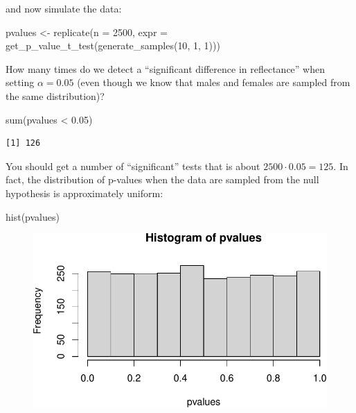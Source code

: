 \documentclass[
  letterpaper,
  DIV=11,
  numbers=noendperiod]{scrreprt}
\newenvironment{Shaded}{\begin{snugshade}}{\end{snugshade}}
\newcommand{\AttributeTok}[1]{\textcolor[rgb]{0.40,0.45,0.13}{#1}}
\newcommand{\DecValTok}[1]{\textcolor[rgb]{0.68,0.00,0.00}{#1}}
\newcommand{\FloatTok}[1]{\textcolor[rgb]{0.68,0.00,0.00}{#1}}
\newcommand{\FunctionTok}[1]{\textcolor[rgb]{0.28,0.35,0.67}{#1}}
\newcommand{\NormalTok}[1]{\textcolor[rgb]{0.00,0.23,0.31}{#1}}
\newcommand{\OtherTok}[1]{\textcolor[rgb]{0.00,0.23,0.31}{#1}}
\newcommand{\SpecialCharTok}[1]{\textcolor[rgb]{0.37,0.37,0.37}{#1}}
\begin{document}
and now simulate the data:

\begin{Shaded}
\begin{Highlighting}[]
\NormalTok{pvalues }\OtherTok{\textless{}{-}} \FunctionTok{replicate}\NormalTok{(}\AttributeTok{n =} \DecValTok{2500}\NormalTok{, }
                     \AttributeTok{expr =} \FunctionTok{get\_p\_value\_t\_test}\NormalTok{(}\FunctionTok{generate\_samples}\NormalTok{(}\DecValTok{10}\NormalTok{, }\DecValTok{1}\NormalTok{, }\DecValTok{1}\NormalTok{)))}
\end{Highlighting}
\end{Shaded}

How many times do we detect a ``significant difference in reflectance''
when setting \(\alpha = 0.05\) (even though we know that males and
females are sampled from the same distribution)?

\begin{Shaded}
\begin{Highlighting}[]
\FunctionTok{sum}\NormalTok{(pvalues }\SpecialCharTok{\textless{}} \FloatTok{0.05}\NormalTok{)}
\end{Highlighting}
\end{Shaded}

\begin{verbatim}
[1] 126
\end{verbatim}

You should get a number of ``significant'' tests that is about
\(2500 \cdot 0.05 = 125\). In fact, the distribution of p-values when
the data are sampled from the null hypothesis is approximately uniform:

\begin{Shaded}
\begin{Highlighting}[]
\FunctionTok{hist}\NormalTok{(pvalues)}
\end{Highlighting}
\end{Shaded}

\begin{figure}[H]

{\centering \includegraphics{./05-hypothesis_files/figure-pdf/unnamed-chunk-8-1.pdf}

}

\end{figure}
\end{document}
